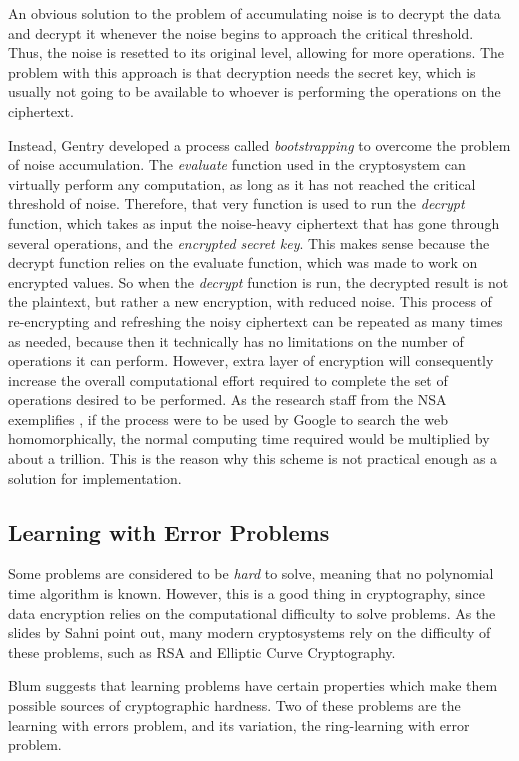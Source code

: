 An obvious solution to the problem of accumulating noise is to decrypt the data and decrypt it whenever the noise begins to approach the critical threshold. Thus, the noise is resetted to its original level, allowing for more operations. The problem with this approach is that decryption needs the secret key, which is usually not going to be available to whoever is performing the operations on the ciphertext. 

Instead, Gentry developed a process called \emph{bootstrapping} to overcome the problem of noise accumulation. The \emph{evaluate} function used in the cryptosystem can virtually perform any computation, as long as it has not reached the critical threshold of noise. Therefore, that very function is used to run the \emph{decrypt} function, which takes as input the noise-heavy ciphertext that has gone through several operations, and the \emph{encrypted secret key}. This makes sense because the decrypt function relies on the evaluate function, which was made to work on encrypted values. So when the \emph{decrypt} function is run, the decrypted result is not the plaintext, but rather a new encryption, with reduced noise. This process of re-encrypting and refreshing the noisy ciphertext can be repeated as many times as needed, because then it technically has no limitations on the number of operations it can perform. However, extra layer of encryption will consequently increase the overall computational effort required to complete the set of operations desired to be performed. As the research staff from the NSA exemplifies \cite{NSA2014}, if the process were to be used by Google to search the web homomorphically, the normal computing time required would be multiplied by about a trillion. This is the reason why this scheme is not practical enough as a solution for implementation.

\subsection{Learning with Error Problems}

Some problems are considered to be \emph{hard} to solve, meaning that no polynomial time algorithm is known. However, this is a good thing in cryptography, since data encryption relies on the computational difficulty to solve problems. As the slides by Sahni \cite{sahni1999} point out, many modern cryptosystems rely on the difficulty of these problems, such as RSA and Elliptic Curve Cryptography.

Blum \cite{Blum:1993:CPB:646758.759585} suggests that learning problems have certain properties which make them possible sources of cryptographic hardness. Two of these problems are the learning with errors problem, and its variation, the ring-learning with error problem.

